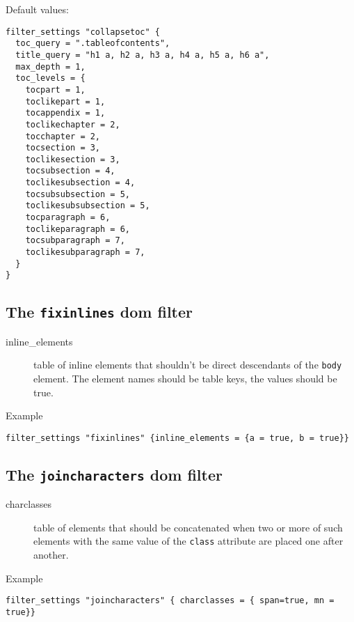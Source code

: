 Default values:

\begin{verbatim}
filter_settings "collapsetoc" {
  toc_query = ".tableofcontents",
  title_query = "h1 a, h2 a, h3 a, h4 a, h5 a, h6 a",
  max_depth = 1,
  toc_levels = {
    tocpart = 1,
    toclikepart = 1,
    tocappendix = 1,
    toclikechapter = 2,
    tocchapter = 2,
    tocsection = 3,
    toclikesection = 3,
    tocsubsection = 4,
    toclikesubsection = 4,
    tocsubsubsection = 5,
    toclikesubsubsection = 5,
    tocparagraph = 6,
    toclikeparagraph = 6,
    tocsubparagraph = 7,
    toclikesubparagraph = 7,
  }
}
\end{verbatim}

\hypertarget{the-fixinlines-dom-filter}{%
\subsection{\texorpdfstring{The \texttt{fixinlines} dom
filter}{The fixinlines dom filter}}\label{the-fixinlines-dom-filter}}

\begin{description}
\item[inline\_elements]
table of inline elements that shouldn't be direct descendants of the
\texttt{body} element. The element names should be table keys, the
values should be true.
\end{description}

Example

\begin{verbatim}
filter_settings "fixinlines" {inline_elements = {a = true, b = true}}
\end{verbatim}

\hypertarget{the-joincharacters-dom-filter}{%
\subsection{\texorpdfstring{The \texttt{joincharacters} dom
filter}{The joincharacters dom filter}}\label{the-joincharacters-dom-filter}}

\begin{description}
\item[charclasses]
table of elements that should be concatenated when two or more of such
elements with the same value of the \texttt{class} attribute are placed
one after another.
\end{description}

Example

\begin{verbatim}
filter_settings "joincharacters" { charclasses = { span=true, mn = true}}
\end{verbatim}

